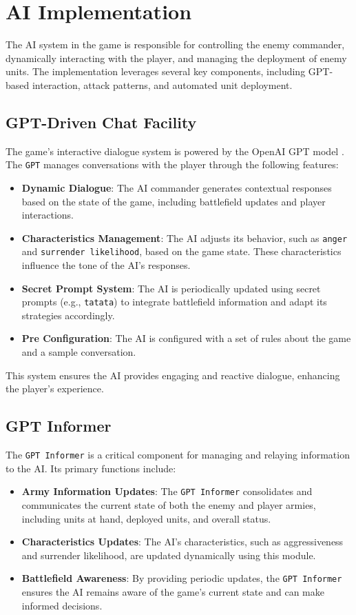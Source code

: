 \chapter{AI Implementation}

The AI system in the game is responsible for controlling the enemy commander, dynamically interacting with the player, and managing the deployment of enemy units. The implementation leverages several key components, including GPT-based interaction, attack patterns, and automated unit deployment.

\section{GPT-Driven Chat Facility}
The game's interactive dialogue system is powered by the OpenAI GPT model  \cite{openaiDotNet}. The \texttt{GPT} manages conversations with the player through the following features:
\begin{itemize}
    \item \textbf{Dynamic Dialogue}: The AI commander generates contextual responses based on the state of the game, including battlefield updates and player interactions.
    \item \textbf{Characteristics Management}: The AI adjusts its behavior, such as \texttt{anger} and \texttt{surrender likelihood}, based on the game state. These characteristics influence the tone of the AI's responses.
    \item \textbf{Secret Prompt System}: The AI is periodically updated using secret prompts (e.g., \texttt{tatata}) to integrate battlefield information and adapt its strategies accordingly.
    \item \textbf{Pre Configuration}: The AI is configured with a set of rules about the game and a sample conversation.
\end{itemize}
This system ensures the AI provides engaging and reactive dialogue, enhancing the player's experience.

\section{GPT Informer}
The \texttt{GPT Informer} is a critical component for managing and relaying information to the AI. Its primary functions include:
\begin{itemize}
    \item \textbf{Army Information Updates}: The \texttt{GPT Informer} consolidates and communicates the current state of both the enemy and player armies, including units at hand, deployed units, and overall status.
    \item \textbf{Characteristics Updates}: The AI's characteristics, such as aggressiveness and surrender likelihood, are updated dynamically using this module.
    \item \textbf{Battlefield Awareness}: By providing periodic updates, the \texttt{GPT Informer} ensures the AI remains aware of the game's current state and can make informed decisions.
\end{itemize}

